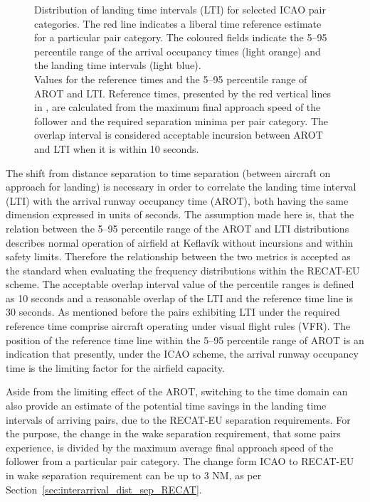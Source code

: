 \begin{figure}[h]
\caption[Distribution of landing time interval (LTI) for ICAO pairs]{\protect{} Distribution of landing time intervals (LTI) for selected ICAO pair categories. The red line indicates a liberal time reference estimate for a particular pair category. The coloured fields indicate the 5--95 percentile range of the arrival occupancy times (light orange) and the landing time intervals (light blue). \\
\protect{} Values for the reference times and the 5--95 percentile range of AROT and LTI. Reference times, presented by the red vertical lines in \protect{}, are calculated from the maximum final approach speed of the follower and the required separation minima per pair category. The overlap interval is considered acceptable incursion between AROT and LTI when it is within 10 seconds.}
\label{fig:time_separ_HH_HM_MH_MM_pairs}
\end{figure}

The shift from distance separation to time separation (between aircraft on approach for landing) is necessary in order to correlate the landing time interval (LTI) with the arrival runway occupancy time (AROT), both having the same dimension expressed in units of seconds. The assumption made here is, that the relation between the 5--95 percentile range of the AROT and LTI distributions describes normal operation of airfield at Keflavík without incursions and within safety limits. Therefore the relationship between the two metrics is accepted as the standard when evaluating the frequency distributions within the RECAT-EU scheme.  The acceptable overlap interval value of the percentile ranges is defined as 10 seconds and a reasonable overlap of the LTI and the reference time line is 30 seconds. As mentioned before the pairs exhibiting LTI under the required reference time comprise aircraft operating under visual flight rules (VFR). The position of the reference time line within the 5--95 percentile range of AROT is an indication that presently, under the ICAO scheme, the arrival runway occupancy time is the limiting factor for the airfield capacity.  

Aside from the limiting effect of the AROT, switching to the time domain can also provide an estimate of the potential time savings in the landing time intervals of arriving pairs, due to the RECAT-EU separation requirements. For the purpose, the change in the wake separation requirement, that some pairs experience, is divided by the maximum average final approach speed of the follower from a particular pair category. The change form ICAO to RECAT-EU in wake separation requirement can be up to 3 NM, as per Section~\ref{sec:interarrival_dist_sep_RECAT}. 

